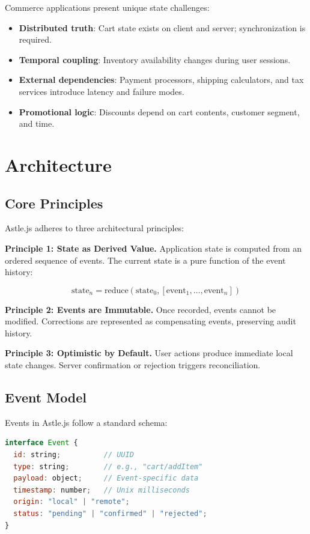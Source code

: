 \documentclass[11pt,twocolumn]{article}
\begin{document}
Commerce applications present unique state challenges:

\begin{itemize}
\item \textbf{Distributed truth}: Cart state exists on client and server; synchronization is required.
\item \textbf{Temporal coupling}: Inventory availability changes during user sessions.
\item \textbf{External dependencies}: Payment processors, shipping calculators, and tax services introduce latency and failure modes.
\item \textbf{Promotional logic}: Discounts depend on cart contents, customer segment, and time.
\end{itemize}

\section{Architecture}

\subsection{Core Principles}

Astle.js adheres to three architectural principles:

\textbf{Principle 1: State as Derived Value.} Application state is computed from an ordered sequence of events. The current state is a pure function of the event history:

\begin{equation}
\text{state}_n = \text{reduce}(\text{state}_0, [\text{event}_1, \ldots, \text{event}_n])
\end{equation}

\textbf{Principle 2: Events are Immutable.} Once recorded, events cannot be modified. Corrections are represented as compensating events, preserving audit history.

\textbf{Principle 3: Optimistic by Default.} User actions produce immediate local state changes. Server confirmation or rejection triggers reconciliation.

\subsection{Event Model}

Events in Astle.js follow a standard schema:

\begin{lstlisting}[language=JavaScript,caption=Event schema]
interface Event {
  id: string;          // UUID
  type: string;        // e.g., "cart/addItem"
  payload: object;     // Event-specific data
  timestamp: number;   // Unix milliseconds
  origin: "local" | "remote";
  status: "pending" | "confirmed" | "rejected";
}
\end{lstlisting}
\end{document}
